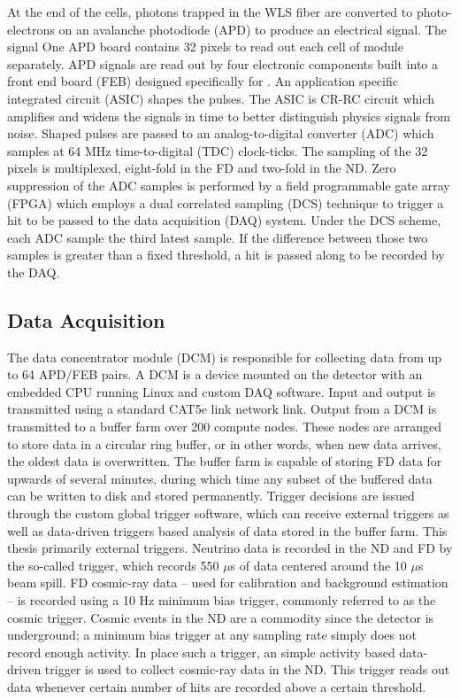 At the end of the cells, photons trapped in the WLS fiber are converted to photo-electrons on an avalanche photodiode (APD) to produce an electrical signal.  The signal One APD board contains 32 pixels to read out each cell of module separately.  APD signals are read out by four electronic components built into a front end board (FEB) designed specifically for \nova.  An application specific integrated circuit (ASIC) shapes the pulses.  The ASIC is CR-RC circuit which amplifies and widens the signals in time to better distinguish physics signals from noise.   Shaped pulses are passed to an analog-to-digital converter (ADC) which samples at 64 MHz time-to-digital (TDC) clock-ticks.  The sampling of the 32 pixels is multiplexed, eight-fold in the FD and two-fold in the ND.  Zero suppression of the ADC samples is performed by a field programmable gate array (FPGA) which employs a dual correlated sampling (DCS) technique to trigger a hit to be passed to the data acquisition (DAQ) system.  Under the DCS scheme, each ADC sample the third latest sample.  If the difference between those two samples is greater than a fixed threshold, a hit is passed along to be recorded by the DAQ.

\subsection{Data Acquisition}

The \nova data concentrator module (DCM) is responsible for collecting data from up to 64 APD/FEB pairs.   A DCM is a device mounted on the detector with an embedded CPU running Linux and custom \nova DAQ software.  Input and output is transmitted using a standard CAT5e link network link.  Output from a DCM is transmitted to a buffer farm over 200 compute nodes.  These nodes are arranged to store data in a circular ring buffer, or in other words, when new data arrives, the oldest data is overwritten.  The buffer farm is capable of storing FD data for upwards of several minutes, during which time any subset of the buffered data can be written to disk and stored permanently.  Trigger decisions are issued through the custom \nova global trigger software, which can receive external triggers as well as data-driven triggers based analysis of data stored in the buffer farm.  This thesis primarily external triggers.  Neutrino data is recorded in the ND and FD by the so-called \numi trigger, which records 550 $\mu$s of data centered around the 10 $\mu$s \numi beam spill.  FD cosmic-ray data -- used for calibration and background estimation -- is recorded using a 10 Hz minimum bias trigger, commonly referred to as the cosmic trigger.   Cosmic events in the ND are a commodity since the detector is underground; a minimum bias trigger at any sampling rate simply does not record enough activity.  In place such a trigger, an simple activity based data-driven trigger is used to collect cosmic-ray data in the ND.  This trigger reads out data whenever certain number of hits are recorded above a certain threshold.

